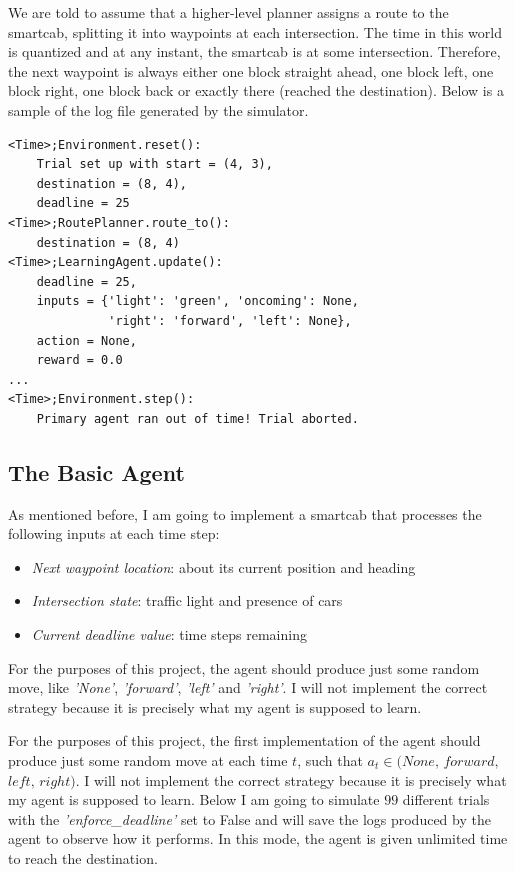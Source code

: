 \documentclass[a4paper]{article}
\begin{document}
We are told to assume that a higher-level planner assigns a route to the smartcab, splitting it into waypoints at each intersection. The time in this world is quantized and at any instant, the smartcab is at some intersection. Therefore, the next waypoint is always either one block straight ahead, one block left, one block right, one block back or exactly there (reached the destination). Below is a sample of the log file generated by the simulator.

\begin{lstlisting}
<Time>;Environment.reset():
    Trial set up with start = (4, 3),
    destination = (8, 4),
    deadline = 25
<Time>;RoutePlanner.route_to():
    destination = (8, 4)
<Time>;LearningAgent.update():
    deadline = 25,
    inputs = {'light': 'green', 'oncoming': None,
              'right': 'forward', 'left': None},
    action = None,
    reward = 0.0
...
<Time>;Environment.step():
    Primary agent ran out of time! Trial aborted.
\end{lstlisting}

\subsection{The Basic Agent}
As mentioned before, I am going to implement a smartcab that processes the following inputs at each time step:

\begin{itemize}
\item \textit{Next waypoint location}: about its current position and heading
\item \textit{Intersection state}: traffic light and presence of cars
\item \textit{Current deadline value}: time steps remaining
\end{itemize}

For the purposes of this project, the agent should produce just some random move, like \textit{'None'}, \textit{'forward'}, \textit{'left'} and \textit{'right'}. I will not implement the correct strategy because it is precisely what my agent is supposed to learn.

For the purposes of this project, the first implementation of the agent should produce just some random move at each time $t$, such that $a_t \in (None,\, forward,\,$
$ left,\, right)$. I will not implement the correct strategy because it is precisely what my agent is supposed to learn. Below I am going to simulate $99$ different trials with the \textit{'enforce\_deadline'} set to False and will save the logs produced by the agent to observe how it performs. In this mode, the agent is given unlimited time to reach the destination.
\end{document}

